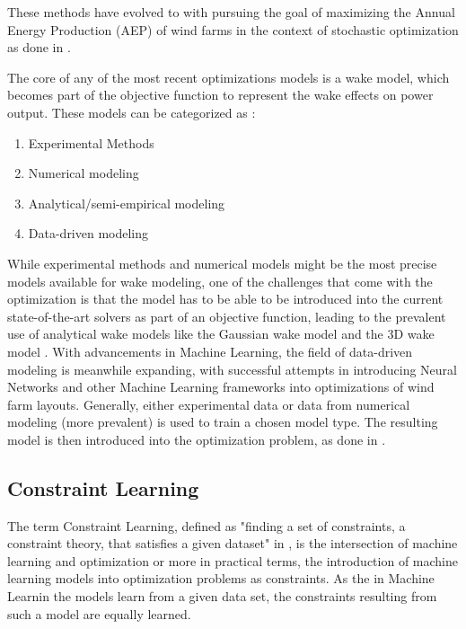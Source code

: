 \documentclass[preprint,12pt]{elsarticle}
\begin{document}
These methods have evolved to with pursuing the goal of maximizing the Annual Energy Production (AEP) of wind farms in the context of stochastic optimization as done in \cite{Sinner_2024} \cite{KIM2024123383}. 

The core of any of the most recent optimizations models is a wake model, which becomes part of the objective function to represent the wake effects on power output. These models can be categorized as \cite{WANG2024118508}: 

\begin{enumerate}
	\item Experimental Methods
	\item Numerical modeling
	\item Analytical/semi-empirical modeling
	\item Data-driven modeling
\end{enumerate}

While experimental methods and numerical models might be the most precise models available for wake modeling, one of the challenges that come with the optimization is that the model has to be able to be introduced into the current state-of-the-art solvers as part of an objective function, leading to the prevalent use of analytical wake models like the Gaussian wake model and the 3D wake model  \cite{WANG2024118508}. With advancements in Machine Learning, the field of data-driven modeling is meanwhile expanding, with successful attempts in introducing Neural Networks and other Machine Learning frameworks into optimizations of wind farm layouts. Generally, either experimental data or data from numerical modeling (more prevalent) is used to train  a chosen model type. The resulting model is then introduced into the optimization problem, as done in \cite{YANG2023119240} \cite{wes-9-869-2024} \cite{TI2020114025} \cite{TI2021618}. 

\subsection{Constraint Learning}

The term Constraint Learning, defined as "finding a set of constraints, a constraint theory, that satisfies a given dataset" in \cite{de2018learning}, is the intersection of machine learning and optimization or more in practical terms, the introduction of machine learning models into optimization problems as constraints. As the in Machine Learnin the models learn from a given data set, the constraints resulting from such a model are equally learned. \cite{de2018learning} 
\end{document}
